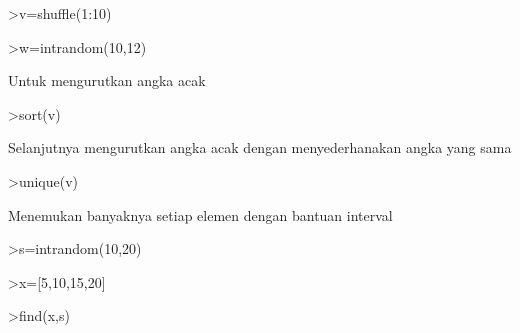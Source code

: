 \documentclass[a4paper,10pt]{article}
\begin{document}
\begin{eulernotebook}
\begin{eulercomment}
\begin{eulercomment}
\begin{eulercomment}
\begin{eulercomment}
\begin{eulercomment}
\end{eulercomment}
\begin{eulerprompt}
>v=shuffle(1:10)
\end{eulerprompt}
\begin{euleroutput}
  [6,  3,  1,  5,  10,  4,  9,  8,  2,  7]
\end{euleroutput}
\begin{eulerprompt}
>w=intrandom(10,12)
\end{eulerprompt}
\begin{euleroutput}
  [11,  4,  9,  3,  6,  4,  11,  3,  6,  2]
\end{euleroutput}
\begin{eulercomment}
Untuk mengurutkan angka acak 
\end{eulercomment}
\begin{eulerprompt}
>sort(v)
\end{eulerprompt}
\begin{euleroutput}
  [1,  2,  3,  4,  5,  6,  7,  8,  9,  10]
\end{euleroutput}
\begin{eulercomment}
Selanjutnya mengurutkan angka acak dengan menyederhanakan angka yang
sama
\end{eulercomment}
\begin{eulerprompt}
>unique(v)
\end{eulerprompt}
\begin{euleroutput}
  [1,  2,  3,  4,  5,  6,  7,  8,  9,  10]
\end{euleroutput}
\begin{eulercomment}
Menemukan banyaknya setiap elemen dengan bantuan interval
\end{eulercomment}
\begin{eulerprompt}
>s=intrandom(10,20)
\end{eulerprompt}
\begin{euleroutput}
  [12,  9,  15,  10,  7,  11,  11,  4,  6,  18]
\end{euleroutput}
\begin{eulerprompt}
>x=[5,10,15,20]
\end{eulerprompt}
\begin{euleroutput}
  [5,  10,  15,  20]
\end{euleroutput}
\begin{eulerprompt}
>find(x,s)
\end{eulerprompt}
\begin{euleroutput}
  [2,  1,  3,  2,  1,  2,  2,  0,  1,  3]
\end{euleroutput}

\end{eulercomment}
\end{eulercomment}
\end{eulercomment}
\end{eulercomment}
\end{eulernotebook}
\end{document}
